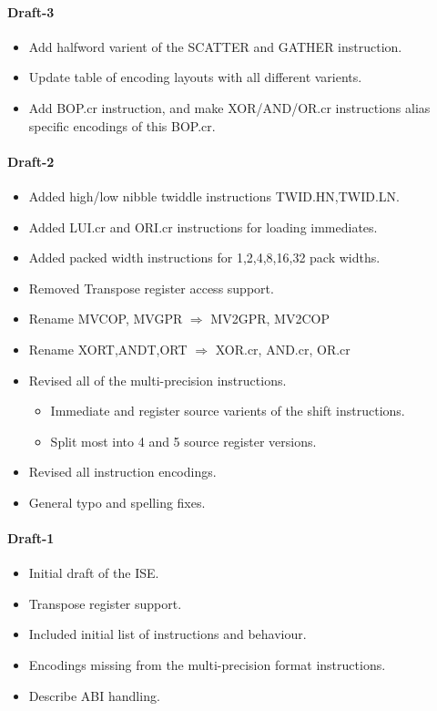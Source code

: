 
\paragraph{Draft-3}
\begin{itemize}
\item Add halfword varient of the SCATTER and GATHER instruction.
\item Update table of encoding layouts with all different varients.
\item Add BOP.cr instruction, and make XOR/AND/OR.cr instructions
    alias specific encodings of this BOP.cr.
\end{itemize}

\paragraph{Draft-2}
\begin{itemize}
\item Added high/low nibble twiddle instructions TWID.HN,TWID.LN.
\item Added LUI.cr and ORI.cr instructions for loading immediates.
\item Added packed width instructions for 1,2,4,8,16,32 pack widths.
\item Removed Transpose register access support.
\item Rename MVCOP, MVGPR  $\Rightarrow$ MV2GPR, MV2COP
\item Rename XORT,ANDT,ORT $\Rightarrow$ XOR.cr, AND.cr, OR.cr
\item Revised all of the multi-precision instructions.
\begin{itemize}
    \item Immediate and register source varients of the shift instructions.
    \item Split most into 4 and 5 source register versions.
\end{itemize}
\item Revised all instruction encodings.
\item General typo and spelling fixes.
\end{itemize}

\paragraph{Draft-1}
\begin{itemize}
\item Initial draft of the ISE.
\item Transpose register support.
\item Included initial list of instructions and behaviour.
\item Encodings missing from the multi-precision format instructions.
\item Describe ABI handling.
\end{itemize}
